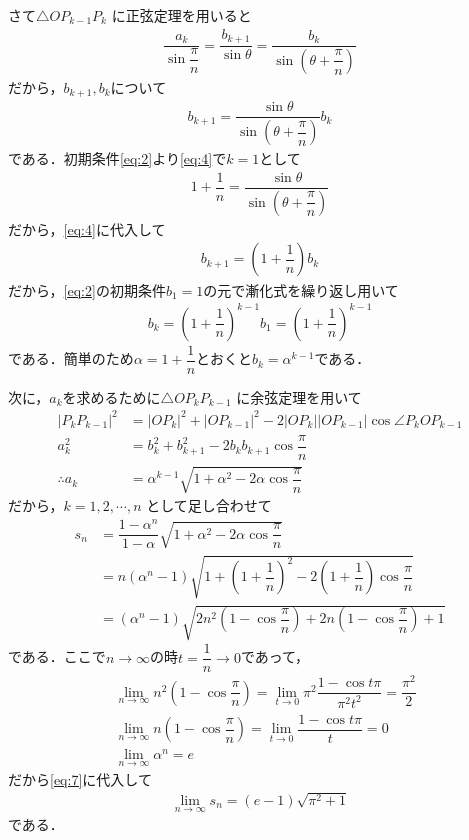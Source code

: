 \documentclass[../../main.tex]{subfiles}
\begin{document}
さて$\triangle O P_{k-1} P_k$ に正弦定理を用いると
\begin{align}
  \dfrac{a_k}{\sin \dfrac{\pi}{n}}
  = \dfrac{b_{k+1}}{\sin \theta}
  = \dfrac{b_k}{\sin\left(\theta + \dfrac{\pi}{n}\right)} \label{eq:3}
\end{align}
だから，$b_{k+1},b_{k}$について
\begin{align}
  b_{k+1} = \dfrac{\sin \theta}{\sin\left(\theta + \dfrac{\pi}{n}\right)} b_k \label{eq:4}
\end{align}
である．初期条件\cref{eq:2}より\cref{eq:4}で$k=1$として
\begin{align}
  1 + \dfrac{1}{n} = \dfrac{\sin \theta}{\sin\left(\theta + \dfrac{\pi}{n}\right)} \label{eq:5}
\end{align}
だから，\cref{eq:4}に代入して
\begin{align}
  b_{k+1} = \left(1 + \dfrac{1}{n}\right) b_k
\end{align}
だから，\cref{eq:2}の初期条件$b_1=1$の元で漸化式を繰り返し用いて
\begin{align}
  b_k = \left(1 + \dfrac{1}{n}\right)^{k-1}b_1 = \left(1 + \dfrac{1}{n}\right)^{k-1} \label{eq:6}
\end{align}
である．簡単のため$\alpha=1+\dfrac{1}{n}$とおくと$b_k=\alpha^{k-1}$である．

次に，$a_k$を求めるために$\triangle O P_k P_{k-1}$ に余弦定理を用いて
\begin{align}
  |P_{k}P_{k-1}|^2
  & = |OP_{k}|^2+|OP_{k-1}|^2-2|OP_{k}||OP_{k-1}|\cos\angle P_{k}OP_{k-1} \\
  a_k^2
  & = b_{k}^2 + b_{k+1}^2 - 2b_{k}b_{k+1}\cos\dfrac{\pi}{n}  \\
  \therefore
  a_{k}
  & = \alpha^{k-1}\sqrt{1+\alpha^2-2\alpha\cos\dfrac{\pi}{n}}
\end{align}
だから，$k=1,2,\cdots,n$ として足し合わせて
\begin{align}
  s_n
  & = \dfrac{1 - \alpha^n}{1 - \alpha} \sqrt{1 + \alpha^2 - 2\alpha \cos \dfrac{\pi}{n}} \\
  & = n(\alpha^n-1)\sqrt{1+\left(1+\dfrac{1}{n}\right)^2-2\left(1+\dfrac{1}{n}\right)\cos \dfrac{\pi}{n}} \\
  & = (\alpha^n-1)\sqrt{2n^2\left(1-\cos\dfrac{\pi}{n}\right)+2n(1-\cos\dfrac{\pi}{n}) + 1} \label{eq:7}
\end{align}
である．ここで$n\to\infty$の時$t=\dfrac{1}{n}\to 0$であって，
\begin{align}
  & \lim_{n\to\infty} n^2\left(1-\cos\dfrac{\pi}{n}\right)
  = \lim_{t\to 0} \pi^2\dfrac{1-\cos t\pi}{\pi^2t^2} = \dfrac{\pi^2}{2} \\
  & \lim_{n\to\infty} n(1-\cos\dfrac{\pi}{n})
  = \lim_{t\to 0} \dfrac{1-\cos t\pi}{t} = 0 \\
  & \lim_{n\to\infty} \alpha^n
  = e
\end{align}
だから\cref{eq:7}に代入して
\begin{align}
  \lim_{n\to\infty} s_n = (e - 1) \sqrt{\pi^2 + 1}
\end{align}
である．
\end{document}
